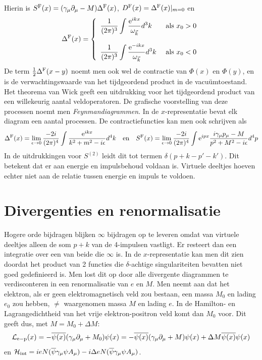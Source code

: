 \documentclass[twoside]{report}
\begin{document}
Hierin is $S^{\rm F}(x)=(\gamma_\mu\partial_\mu-M)\Delta^{\rm F}(x)$,
$D^{\rm F}(x)=\Delta^{\rm F}(x)|_{m=0}$ en
\[
\Delta^{\rm F}(x)=\left\{\begin{array}{ll}
\displaystyle\frac{1}{(2\pi)^3}\int\frac{{\rm e}^{ikx}}{\omega_{\vec{k}}}d^3k&~\mbox{als}~x_0>0\\
\\
\displaystyle\frac{1}{(2\pi)^3}\int\frac{{\rm e}^{-ikx}}{\omega_{\vec{k}}}d^3k&~\mbox{als}~x_0<0
\end{array}\right.
\]
De term $\mbox{$\frac{1}{2}$}\Delta^{\rm F}(x-y)$ noemt men ook wel de contractie van
$\Phi(x)$ en $\Phi(y)$, en is de verwachtingswaarde van het tijdgeordend
product in de vacu\"umtoestand. Het theorema van Wick geeft een uitdrukking
voor het tijdgeordend product van een willekeurig aantal veldoperatoren. De
grafische voorstelling van deze processen noemt men {\it Feynmandiagrammen}.
In de $x$-representatie bevat elk diagram een aantal processen. De
contractiefuncties kan men ook schrijven als
\[
\Delta^{\rm F}(x)=\lim_{\epsilon\rightarrow0}\frac{-2i}{(2\pi)^4}
\int\frac{{\rm e}^{ikx}}{k^2+m^2-i\epsilon}d^4k
~~~\mbox{en}~~~
S^{\rm F}(x)=\lim_{\epsilon\rightarrow0}\frac{-2i}{(2\pi)^4}
\int{\rm e}^{ipx}\frac{i\gamma_\mu p_\mu-M}{p^2+M^2-i\epsilon}d^4p
\]
In de uitdrukkingen voor $S^{(2)}$ leidt dit tot termen $\delta(p+k-p'-k')$.
Dit betekent dat er aan energie en impulsbehoud voldaan is. Virtuele
deeltjes hoeven echter niet aan de relatie tussen energie en impuls te
voldoen.

\section[~~Divergenties en renormalisatie]{Divergenties en renormalisatie}
Hogere orde bijdragen blijken $\infty$ bijdragen op te leveren omdat van
virtuele deeltjes alleen de som $p+k$ van de 4-impulsen vastligt. Er resteert
dan een integratie over een van beide die $\infty$ is. In de $x$-representatie
kan men dit zien doordat het product van 2 functies die $\delta$-achtige
singulariteiten bevatten niet goed gedefinieerd is. Men lost dit op door
alle divergente diagrammen te verdisconteren in een renormalisatie van $e$
en $M$. Men neemt aan dat het elektron, als er geen elektromagnetisch veld
zou bestaan, een massa $M_0$ en lading $e_0$ zou hebben, $\neq$ waargenomen
massa $M$ en lading $e$. In de Hamilton- en Lagrangedichtheid van het vrije
elektron-positron veld komt dan $M_0$ voor. Dit geeft dus, met $M=M_0+\Delta M$:
\[
{\cal L}_{\rm e-p}(x)=-\overline{\psi(x)}(\gamma_\mu\partial_\mu+M_0)\psi(x)=
-\overline{\psi(x)}(\gamma_\mu\partial_\mu+M)\psi(x)+\Delta M\overline{\psi(x)}\psi(x)
\]
en ${\cal H}_{\rm int}=ieN(\overline{\psi}\gamma_\mu\psi A_\mu)-i\Delta eN(\overline{\psi}\gamma_\mu\psi A_\mu)$.
\end{document}
